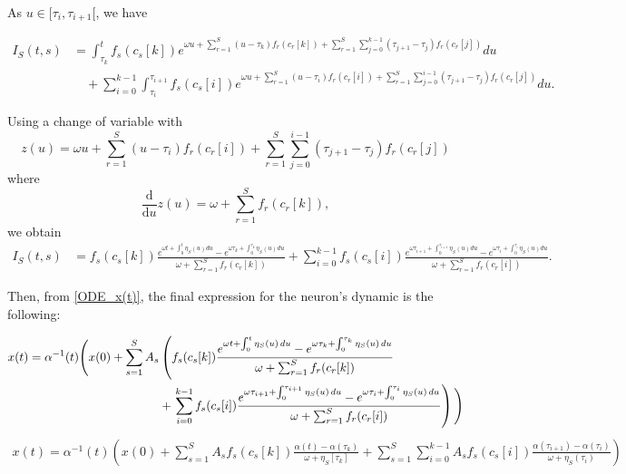\documentclass{article}
\begin{document}
As $u \in [\tau_i, \tau_{i+1}[$, we have

\begin{align*}
I_S(t, s)&=\int_{\tau_k}^{t } f_s(c_s[k]) e^{\omega u + \sum_{r=1}^{S} (u-\tau_k)f_r(c_r[k]) + \sum_{r=1}^{S} \sum_{j=0}^{k-1} (\tau_{j+1}-\tau_j)f_r(c_r[j]) } du \\
&\quad + \sum_{i=0}^{k-1} \int_{\tau_i}^{\tau_{i+1}} f_s(c_s[i]) e^{\omega u + \sum_{r=1}^{S} (u-\tau_i)f_{r}(c_{r}[i]) + \sum_{r=1}^{S} \sum_{j=0}^{i-1} (\tau_{j+1}-\tau_j)f_{r}(c_{r}[j])} du.
\end{align*}


Using a change of  variable with 
\begin{equation}
z(u) = \omega u + \sum_{r=1}^{S} (u-\tau_i)f_{r}(c_{r}[i]) + \sum_{r=1}^{S} \sum_{j=0}^{i-1} (\tau_{j+1}-\tau_j)f_{r}(c_{r}[j])
\end{equation}
where 
\begin{equation}
\frac{\mathrm{d}}{\mathrm{d}u}z(u) = \omega + \sum_{r = 1}^{S}f_r(c_{r}[k]),
\end{equation}
we obtain
\begin{align}
I_S(t,s)&= f_s(c_s[k]) \frac{e^{\omega t + \int_0^t\eta_S(u)du } - e^{\omega \tau_k + \int_0^{\tau_k}\eta_S(u)du  }}{\omega + \sum_{r = 1}^{S}f_r(c_{r}[k]) } +\sum_{i=0}^{k-1} f_s(c_s[i]) \frac{e^{\omega\tau_{i+1}+ \int_0^{\tau_{i+1}}\eta_S(u)du}- e^{\omega \tau_i +  \int_0^{\tau_{i}}\eta_S(u)du}}{\omega + \sum_{r = 1}^{S}f_r(c_{r}[i])}.
\end{align}


Then, from \eqref{ODE_x(t)}, the final expression for the neuron's dynamic is the following:

\begin{align}
 x(t) = \alpha^{-1}(t) \Bigg( x(0)
 + \sum_{s=1}^S A_s &\left( f_s(c_s[k]) \frac{e^{\omega t + \int_0^t \eta_S(u) \, du} - e^{\omega \tau_k + \int_0^{\tau_k} \eta_S(u) \, du}}{\omega + \sum_{r = 1}^S f_r(c_{r}[k])} \right. \notag \\
 &+ \left. \sum_{i=0}^{k-1} f_s(c_s[i]) \frac{e^{\omega \tau_{i+1} + \int_0^{\tau_{i+1}} \eta_S(u) \, du} - e^{\omega \tau_i + \int_0^{\tau_i} \eta_S(u) \, du}}{\omega + \sum_{r = 1}^S f_r(c_{r}[i])} \right) \Bigg)
\end{align}
\begin{align}
x(t) = \alpha^{-1}(t) \left(x(0) + \sum_{s=1}^S A_sf_s(c_s[k]) \frac{\alpha(t)-\alpha(\tau_k)}{\omega + \eta_S[\tau_k]} + \sum_{s=1}^S\sum_{i=0}^{k-1} A_sf_s(c_s[i]) \frac{\alpha(\tau_{i+1})-\alpha(\tau_i) }{\omega + \eta_S(\tau_i)}\right)
\end{align}
\end{document}
